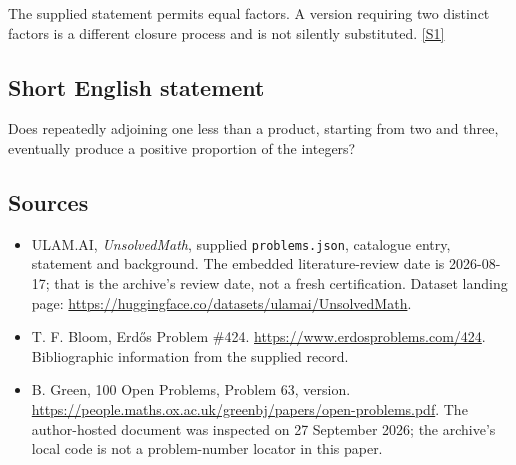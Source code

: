 \documentclass[11pt,a4paper]{article}
\newcommand{\sref}[2]{\hyperlink{source:#1:#2}{[S#2]}}
\begin{document}
The supplied statement permits equal factors. A version requiring two distinct factors is a different closure process and is not silently substituted. \sref{statement}{1}

\subsection{Short English statement}

Does repeatedly adjoining one less than a product, starting from two and three, eventually produce a positive proportion of the integers?

\subsection{Sources}

{\small

\begin{itemize}

\item[\hypertarget{source:statement:1}{S1}] ULAM.AI, \emph{UnsolvedMath}, supplied \texttt{problems.json}, catalogue entry, statement and background. The embedded literature-review date is 2026-08-17; that is the archive’s review date, not a fresh certification. Dataset landing page: \url{https://huggingface.co/datasets/ulamai/UnsolvedMath}.

\item[\hypertarget{source:statement:2}{S2}] T. F. Bloom, Erdős Problem \#424. \url{https://www.erdosproblems.com/424}. Bibliographic information from the supplied record.

\item[\hypertarget{source:statement:3}{S3}] B. Green, 100 Open Problems, Problem 63, version. \url{https://people.maths.ox.ac.uk/greenbj/papers/open-problems.pdf}. The author-hosted document was inspected on 27 September 2026; the archive’s local code is not a problem-number locator in this paper.

\end{itemize}

}

\label{end:statement}
\end{document}
